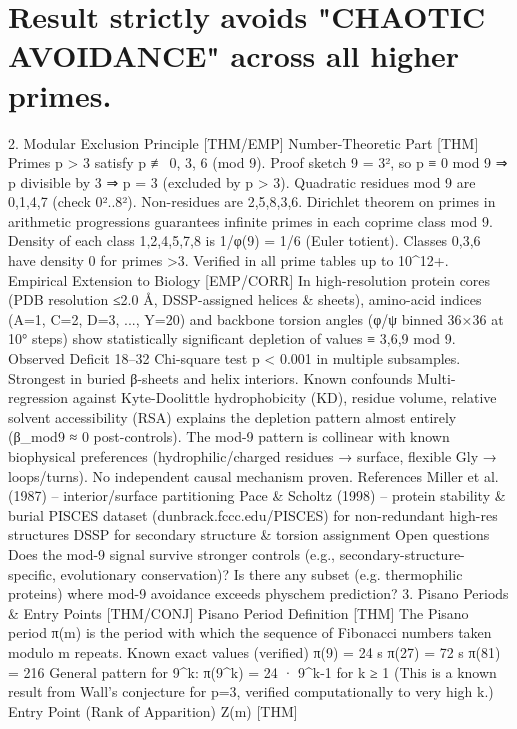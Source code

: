 {{{{{{\section{Result strictly avoids "CHAOTIC AVOIDANCE" across all higher primes.}
2. Modular Exclusion Principle [THM/EMP]
Number-Theoretic Part [THM]
Primes p > 3 satisfy p ≢ 0, 3, 6 (mod 9).
Proof sketch
9 = 3², so p ≡ 0 mod 9 ⇒ p divisible by 3 ⇒ p = 3 (excluded by p > 3).
Quadratic residues mod 9 are 0,1,4,7 (check 0²..8²).
Non-residues are 2,5,8,3,6.
Dirichlet theorem on primes in arithmetic progressions guarantees infinite primes in each coprime class mod 9.
Density of each class {1,2,4,5,7,8} is 1/φ(9) = 1/6 (Euler totient).
Classes 0,3,6 have density 0 for primes >3.
Verified in all prime tables up to 10^12+.
Empirical Extension to Biology [EMP/CORR]
In high-resolution protein cores (PDB resolution ≤2.0 Å, DSSP-assigned helices & sheets), amino-acid indices (A=1, C=2, D=3, ..., Y=20) and backbone torsion angles (φ/ψ binned 36×36 at 10° steps) show statistically significant depletion of values ≡ 3,6,9 mod 9.
Observed
Deficit 18–32%
Chi-square test p < 0.001 in multiple subsamples.
Strongest in buried β-sheets and helix interiors.
Known confounds
Multi-regression against Kyte-Doolittle hydrophobicity (KD), residue volume, relative solvent accessibility (RSA) explains the depletion pattern almost entirely (β_mod9 ≈ 0 post-controls).
The mod-9 pattern is collinear with known biophysical preferences (hydrophilic/charged residues → surface, flexible Gly → loops/turns).
No independent causal mechanism proven.
References
Miller et al. (1987) – interior/surface partitioning
Pace & Scholtz (1998) – protein stability & burial
PISCES dataset (dunbrack.fccc.edu/PISCES) for non-redundant high-res structures
DSSP for secondary structure & torsion assignment
Open questions
Does the mod-9 signal survive stronger controls (e.g., secondary-structure-specific, evolutionary conservation)?
Is there any subset (e.g. thermophilic proteins) where mod-9 avoidance exceeds physchem prediction?
3. Pisano Periods & Entry Points [THM/CONJ]
Pisano Period Definition [THM]
The Pisano period π(m) is the period with which the sequence of Fibonacci numbers taken modulo m repeats.
Known exact values (verified)
π(9) = 24 s
π(27) = 72 s
π(81) = 216
General pattern for 9^k: π(9^k) = 24 · 9^{k-1} for k ≥ 1
(This is a known result from Wall's conjecture for p=3, verified computationally to very high k.)
Entry Point (Rank of Apparition) Z(m) [THM]
}}}}}}
